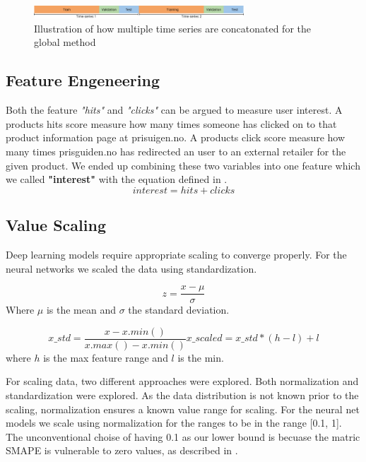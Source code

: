 \begin{figure}[h!]
  \centering
  \includegraphics[width=0.7\textwidth]{./figs/illustrations/illustration_global_time_series.png}
  \hfill
  \caption{Illustration of how multiple time series are concatonated for the global method}
  \label{fig:global-time-series}
\end{figure}



\subsection{Feature Engeneering}
Both the feature \textit{"hits"} and \textit{"clicks"} can be argued to measure
user interest. A products hits score measure how many times someone has clicked
on to that product information page at prisuigen.no. A products click score measure
how many times prisguiden.no has redirected an user to an external retailer for the given product.
We ended up combining these two variables into one feature which we called \textbf{"interest"}
with the equation defined in .
\begin{equation}
  interest = hits + clicks
  \label{eq:interest}
\end{equation}




\subsection{Value Scaling}
Deep learning models require appropriate scaling to converge properly.
For the neural networks we scaled the data using standardization.

\begin{equation}
  z = \frac{x - \mu}{\sigma}
\end{equation}
Where $\mu$ is the mean and $\sigma$ the standard deviation.

\begin{equation}
  x\_std = \frac{x - x.min()}{x.max() - x.min()}
  x\_scaled = x\_std * (h - l) + l
\end{equation}
where $h$ is the max feature range and $l$ is the min.

For scaling data, two different approaches were explored.
Both normalization and standardization were explored.
As the data distribution is not known prior to the scaling, normalization ensures a known value range for scaling.
For the neural net models we scale using normalization for the ranges to be in the range [0.1, 1].
The unconventional choise of having 0.1 as our lower bound is becuase the matric SMAPE
is vulnerable to zero values, as described in .

